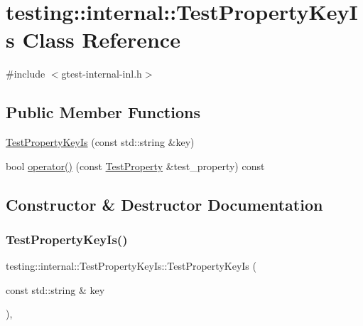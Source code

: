 \hypertarget{classtesting_1_1internal_1_1_test_property_key_is}{}\section{testing\+:\+:internal\+:\+:Test\+Property\+Key\+Is Class Reference}
\label{classtesting_1_1internal_1_1_test_property_key_is}


{\ttfamily \#include $<$gtest-\/internal-\/inl.\+h$>$}

\subsection*{Public Member Functions}
\begin{DoxyCompactItemize}
\item 
\hyperlink{classtesting_1_1internal_1_1_test_property_key_is_a509ed1271caa1032e40c5d811b3da385}{Test\+Property\+Key\+Is} (const std\+::string \&key)
\item 
bool \hyperlink{classtesting_1_1internal_1_1_test_property_key_is_abf5eb5bf22065e0614ffe36d093e885e}{operator()} (const \hyperlink{classtesting_1_1_test_property}{Test\+Property} \&test\+\_\+property) const
\end{DoxyCompactItemize}


\subsection{Constructor \& Destructor Documentation}
\mbox{\label{classtesting_1_1internal_1_1_test_property_key_is_a509ed1271caa1032e40c5d811b3da385}} 
\subsubsection{\texorpdfstring{Test\+Property\+Key\+Is()}{TestPropertyKeyIs()}}
{\footnotesize\ttfamily testing\+::internal\+::\+Test\+Property\+Key\+Is\+::\+Test\+Property\+Key\+Is (\begin{DoxyParamCaption}\item[{const std\+::string \&}]{key }\end{DoxyParamCaption})\hspace{0.3cm}{\ttfamily [inline]}, {\ttfamily [explicit]}}



